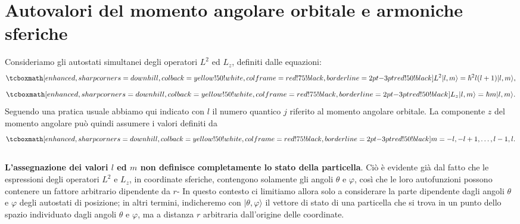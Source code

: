 \section[Autovalori del momento angolare orbitale e armoniche sferiche]{Autovalori del momento angolare orbitale e armoniche sferiche}
Consideriamo gli autostati simultanei degli operatori $L^2$ ed $L_z$, definiti dalle equazioni:
	\begin{equation}
		 \tcboxmath[enhanced, sharp corners=downhill, colback=yellow!50!white, colframe=red!75!black, borderline={2pt}{-3pt}{red!50!black}]{
			L^2 \vert l, m \rangle = \hbar ^2 l(l+1) \vert l, m \rangle ,\label{eq:cap17_6}
		}
	\end{equation}
	\begin{equation}
		\tcboxmath[enhanced, sharp corners=downhill, colback=yellow!50!white, colframe=red!75!black, borderline={2pt}{-3pt}{red!50!black}]{
L_z \vert l, m \rangle = \hbar m \vert l, m \rangle
\label{eq:cap17_7}.
		}
	\end{equation}
Seguendo una pratica usuale abbiamo qui indicato con $l$ il numero quantico $j$ riferito al momento angolare orbitale. La componente $z$ del momento angolare può quindi assumere i valori definiti da
	\begin{equation}
		\tcboxmath[enhanced, sharp corners=downhill, colback=yellow!50!white, colframe=red!75!black, borderline={2pt}{-3pt}{red!50!black}]{
			m = -l, -l+1, \dots,l-1, l .
			}
	\end{equation}\\

\textbf{L'assegnazione dei valori $l$ ed $m$ non definisce completamente lo stato della particella}. Ciò è evidente già dal fatto che le espressioni degli operatori $L^2$ e $L_z$, in coordinate sferiche, contengono solamente gli angoli $\theta$ e $\varphi$, così che le loro autofunzioni possono contenere un fattore arbitrario dipendente da $r$- In questo contesto ci limitiamo allora solo a considerare la parte dipendente dagli angoli $\theta$ e $\varphi$ degli autostati di posizione; in altri termini, indicheremo con $\vert \theta ,\varphi\rangle$ il vettore di stato di una particella che si trova in un punto dello spazio individuato dagli angoli $\theta $ e $\varphi$, ma a distanza $r$ arbitraria dall'origine delle coordinate.\\

